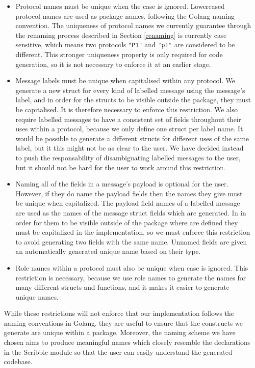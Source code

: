 \documentclass[12pt,twoside]{report}
\begin{document}
\begin{itemize}
    \item Protocol names must be unique when the case is ignored. Lowercased protocol names are used as package names, following the Golang naming convention. The uniqueness of protocol names we currently guarantee through the renaming process described in Section \ref{renaming} is currently case sensitive, which means two protocols \texttt{"P1"} and \texttt{"p1"} are considered to be different. This stronger uniqueness property is only required for code generation, so it is not necessary to enforce it at an earlier stage.
    \item Message labels must be unique when capitalised within any protocol. We generate a new struct for every kind of labelled message using the message's label, and in order for the structs to be visible outside the package, they must be capitalised. It is therefore necessary to enforce this restriction. We also require labelled messages to have a consistent set of fields throughout their uses within a protocol, because we only define one struct per label name. It would be possible to generate a different structs for different uses of the same label, but it this might not be as clear to the user. We have decided instead to push the responsability of disambiguating labelled messages to the user, but it should not be hard for the user to work around this restriction.
    \item Naming all of the fields in a message's payload is optional for the user. However, if they do name the payload fields then the names they give must be unique when capitalized. The payload field names of a labelled message are used as the names of the message struct fields which are generated. In in order for them to be visible outside of the package where are defined they must be capitalized in the implementation, so we must enforce this restriction to avoid generating two fields with the same name. Unnamed fields are given an automatically generated unique name based on their type.
    \item Role names within a protocol must also be unique when case is ignored. This restriction is necessary, because we use role names to generate the names for many different structs and functions, and it makes it easier to generate unique names.
\end{itemize}

While these restrictions will not enforce that our implementation follows the naming conventions in Golang, they are useful to ensure that the constructs we generate are unique within a package. Moreover, the naming scheme we have chosen aims to produce meaningful names which closely resemble the declarations in the Scribble module so that the user can easily understand the generated codebase.
\end{document}
